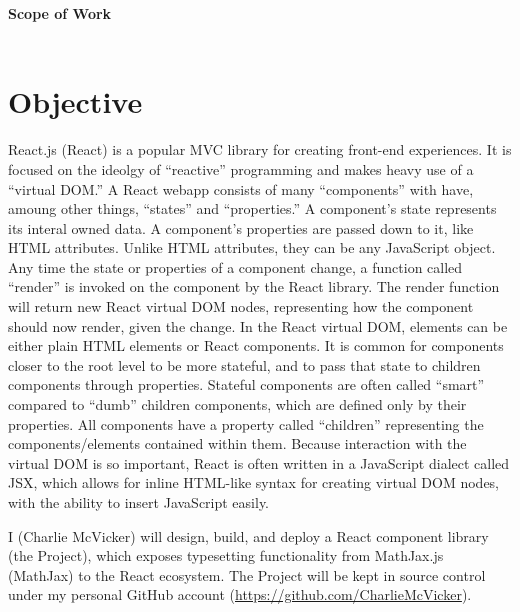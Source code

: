 \documentclass[12pt]{article}
\begin{document}
\noindent
	{\fontsize{24}{0}\textbf{Scope of Work}}\\\\
	{}
	\section*{Objective}
    React.js (React) is a popular MVC library for creating front-end experiences. It is focused on the ideolgy of ``reactive'' programming and makes heavy use of a ``virtual DOM.'' A React webapp consists of many ``components'' with have, amoung other things, ``states'' and ``properties.'' A component's state represents its interal owned data. A component's properties are passed down to it, like HTML attributes. Unlike HTML attributes, they can be any JavaScript object. Any time the state or properties of a component change, a function called ``render'' is invoked on the component by the React library. The render function will return new React virtual DOM nodes, representing how the component should now render, given the change. In the React virtual DOM, elements can be either plain HTML elements or React components. It is common for components closer to the root level to be more stateful, and to pass that state to children components through properties. Stateful components are often called ``smart'' compared to ``dumb'' children components, which are defined only by their properties. All components have a property called ``children'' representing the components/elements contained within them. Because interaction with the virtual DOM is so important, React is often written in a JavaScript dialect called JSX, which allows for inline HTML-like syntax for creating virtual DOM nodes, with the ability to insert JavaScript easily.


		I (Charlie McVicker) will design, build, and deploy a React component library (the Project), which exposes typesetting functionality from MathJax.js (MathJax) to the React ecosystem. The Project will be kept in source control under my personal GitHub account (\url{https://github.com/CharlieMcVicker}).
\end{document}
